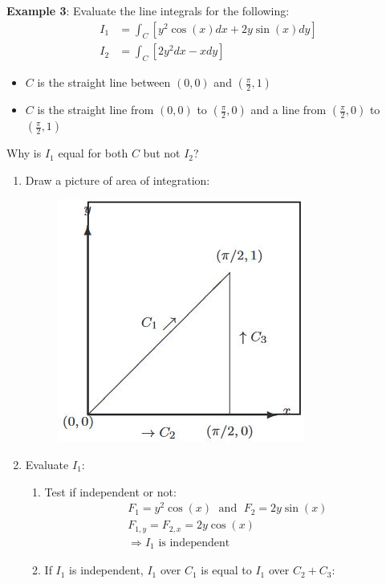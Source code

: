 \documentclass[10pt,a4paper]{article}
\begin{document}
\textbf{Example 3}: Evaluate the line integrals for the following:
\begin{align*}
    I_1 &= \int_C \left[y^2 \cos(x)dx + 2y\sin(x)dy\right] \\
    I_2 &= \int_C \left[2y^2 dx - x dy\right]
\end{align*}
\begin{itemize}
    \item $C$ is the straight line between $(0,0)$ and $(\frac{\pi}{2},1)$
    \item $C$ is the straight line from $(0,0)$ to $(\frac{\pi}{2},0)$ and a line from
    $(\frac{\pi}{2},0)$ to $(\frac{\pi}{2},1)$
\end{itemize}

Why is $I_1$ equal for both $C$ but not $I_2$?

\begin{enumerate}
    \item Draw a picture of area of integration:
    \begin{figure} [h!]
        \centering
        \includegraphics[scale=0.6]{Inde_ex.JPG}
    \end{figure}
    \item Evaluate $I_1$:
    \begin{enumerate}
        \item Test if independent or not:
        \begin{gather*}
            F_1 = y^2\cos(x) \; \text{ and }\; F_2 = 2y\sin(x) \\
            F_{1,y} = F_{2,x} = 2y\cos(x) \\
            \Rightarrow I_1 \text{ is independent}
        \end{gather*}
        \item If $I_1$ is independent, $I_1$ over $C_1$ is equal to $I_1$ over $C_2 + C_3$:

\end{enumerate}
\end{enumerate}
\end{document}
